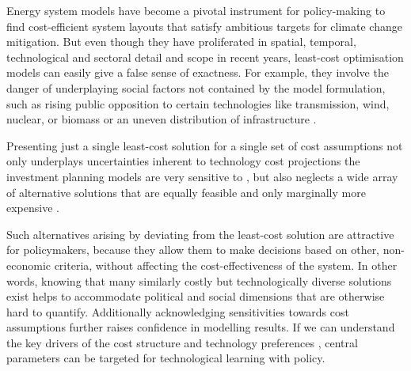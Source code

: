
Energy system models have become a pivotal instrument for policy-making
to find cost-efficient system layouts that satisfy ambitious targets for climate change mitigation.
But even though they have proliferated in spatial, temporal, technological and sectoral detail and scope in recent years,
least-cost optimisation models can easily give a false sense of exactness.
For example, they involve the danger of underplaying social factors
not contained by the model formulation, such as
rising public opposition to certain technologies like transmission, wind, nuclear, or biomass
or an uneven distribution of infrastructure \cite{mccollum_energy_2020,sasse_regional_2020}.

Presenting just a single least-cost solution for a single set of cost assumptions
not only underplays uncertainties inherent to technology cost projections the
investment planning models are very sensitive to
\cite{trondle_trade-offs_2020,Pfenninger2014,yue_review_2018,pye_assessing_2018,pye_modelling_2020},
but also neglects a wide array of alternative solutions
that are equally feasible and only marginally more expensive
\cite{nearoptimal,lombardi_policy_2020,sasse_distributional_2019}.


Such alternatives arising by deviating from the least-cost solution are attractive for policymakers,
because they allow them to make decisions based on other, non-economic criteria,
without affecting the cost-effectiveness of the system.
In other words, knowing that many similarly costly but technologically diverse solutions
exist helps to accommodate political and social dimensions that are otherwise hard to quantify.
Additionally acknowledging sensitivities towards cost assumptions further raises confidence
in modelling results. If we can understand the key drivers of the cost structure and
technology preferences \cite{usher_value_2015,moret_characterization_2017},
central parameters can be targeted for technological learning with policy.



